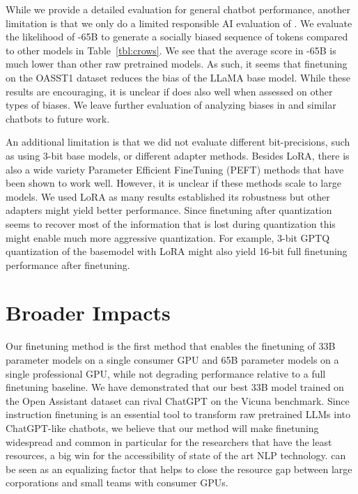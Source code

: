 While we provide a detailed evaluation for general chatbot performance, another limitation is that we only do a limited responsible AI evaluation of \model. We evaluate the likelihood of \model-65B to generate a socially biased sequence of tokens compared to other models in Table~\ref{tbl:crows}. We see that the average score in \model-65B is much lower than other raw pretrained models. As such, it seems that finetuning on the OASST1 dataset reduces the bias of the LLaMA base model. While these results are encouraging, it is unclear if \model does also well when assessed on other types of biases. We leave further evaluation of analyzing biases in \model and similar chatbots to future work.

An additional limitation is that we did not evaluate different bit-precisions, such as using 3-bit base models, or different adapter methods. Besides LoRA, there is also a wide variety Parameter Efficient FineTuning (PEFT) methods that have been shown to work well. However, it is unclear if these methods scale to large models. We used LoRA as many results established its robustness but other adapters might yield better performance. Since finetuning after quantization seems to recover most of the information that is lost during quantization this might enable much more aggressive quantization. For example, 3-bit GPTQ quantization of the basemodel with LoRA might also yield 16-bit full finetuning performance after finetuning.

\section{Broader Impacts}

Our \method finetuning method is the first method that enables the finetuning of 33B parameter models on a single consumer GPU and 65B parameter models on a single professional GPU, while not degrading performance relative to a full finetuning baseline. We have demonstrated that our best 33B model trained on the Open Assistant dataset can rival ChatGPT on the Vicuna benchmark. Since instruction finetuning is an essential tool to transform raw pretrained LLMs into ChatGPT-like chatbots, we believe that our method will make finetuning widespread and common in particular for the researchers that have the least resources, a big win for the accessibility of state of the art NLP technology. \method can be seen as an equalizing factor that helps to close the resource gap between large corporations and small teams with consumer GPUs.

